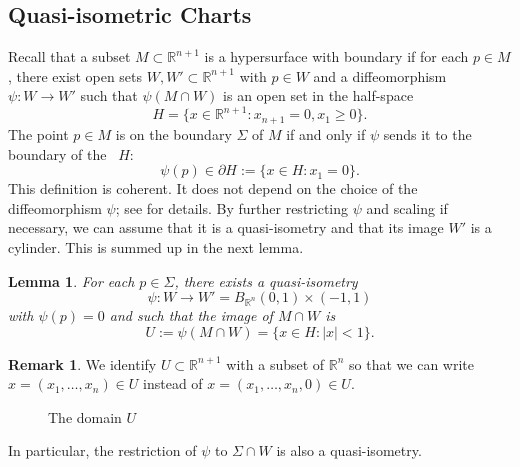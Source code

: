 \documentclass{CUP-JNL-FMP}%
\newtheorem{lemma}[theorem]{Lemma}
\theoremstyle{definition}
\newtheorem{remark}[theorem]{Remark}
\numberwithin{equation}{section}
\begin{document}
\subsection{Quasi-isometric Charts}
Recall that a subset $M\subset\mathbb{R}^{n+1}$ is a hypersurface with boundary if for each $p\in M$, there exist open sets $W,W'\subset\mathbb{R}^{n+1}$ with $p\in W$ and a diffeomorphism $\psi:W\rightarrow W'$ such that
$\psi(M\cap W)$ is an open set in the half-space
$$H=\{x\in\mathbb{R}^{n+1} : x_{n+1}=0, x_1\geq 0\}.$$
The point $p\in M$ is on the boundary $\Sigma$ of $M$ if and only if $\psi$ sends it to the boundary of the ~$H$:
$$\psi(p)\in\partial H:=\{x\in H : x_1=0\}.$$
This definition is coherent. It does not depend on the choice of the diffeomorphism $\psi$;
see \cite[Chapter~1]{Hi76} for details.
By further restricting $\psi$ and scaling if necessary, we can assume that it is a quasi-isometry and that its image $W'$ is a cylinder.
This is summed up in the next lemma.
\begin{lemma}\label{lemma:flatchart}
	For each $p\in\Sigma$, there exists a quasi-isometry
	$$\psi\colon W\longrightarrow W'=B_{\mathbb{R}^n}(0,1)\times (-1,1)$$
	with $\psi(p)=0$ and such that the image of $M\cap W$ is
	$$U:=\psi(M\cap W)=\{x\in H : |x|<1\}.$$
\end{lemma}
\begin{remark}
	We identify $U\subset\mathbb{R}^{n+1}$ with a subset of $\mathbb{R}^n$ so that we can write $x=(x_1,\dots,x_n)\in U$ instead of
	$x=(x_1,\dots,x_n,0)\in U$.
\end{remark}
\begin{figure}[h]
{\caption{The domain $U$}}
\end{figure}
In particular, the restriction of $\psi$ to $\Sigma\cap W$ is also a quasi-isometry.
\end{document}
